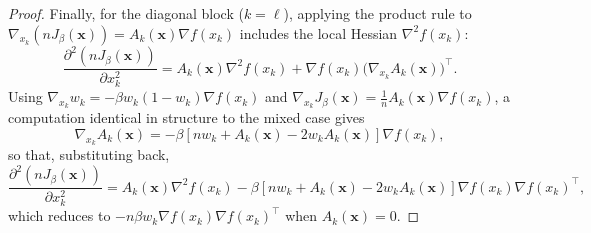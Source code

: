 \documentclass{opt2026} %
\providecommand{\qedhere}{}
\newcommand{\prefactor}[2]{A_{#1}(#2)}
\newcommand{\xx}{\mathbf{x}}
\begin{document}
\begin{proof}
    Finally, for the diagonal block ($k=\ell$), applying the product rule to $\nabla_{x_k}(nJ_\beta(\xx))=\prefactor{k}{\xx}\nabla f(x_k)$ includes the local Hessian $\nabla^2 f(x_k)$:
    \[
        \frac{\partial^2(nJ_\beta(\xx))}{\partial x_k^2} = \prefactor{k}{\xx}\nabla^2f(x_k) + \nabla f(x_k)\bigl(\nabla_{x_k}\prefactor{k}{\xx}\bigr)^\top.
    \]
    Using $\nabla_{x_k}w_k=-\beta w_k(1-w_k)\nabla f(x_k)$ and $\nabla_{x_k}J_\beta(\xx)=\frac1n\prefactor{k}{\xx}\nabla f(x_k)$, a computation identical in structure to the mixed case gives
    \[
        \nabla_{x_k}\prefactor{k}{\xx} = -\beta\left[nw_k+\prefactor{k}{\xx}-2w_k\prefactor{k}{\xx}\right]\nabla f(x_k),
    \]
    so that, substituting back,
    \[
        \frac{\partial^2(nJ_\beta(\xx))}{\partial x_k^2} = \prefactor{k}{\xx}\nabla^2f(x_k) - \beta\left[nw_k+\prefactor{k}{\xx}-2w_k\prefactor{k}{\xx}\right]\nabla f(x_k)\nabla f(x_k)^\top,
    \]
    which reduces to $-n\beta w_k\nabla f(x_k)\nabla f(x_k)^\top$ when $\prefactor{k}{\xx}=0$. \qedhere
\end{proof}
\end{document}
